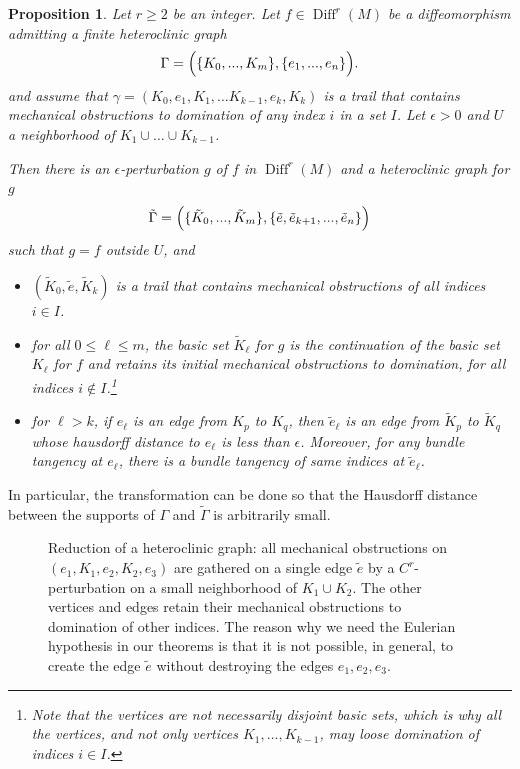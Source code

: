\documentclass[11pt, a4paper]{amsart}
\theoremstyle{plain}
\newtheorem{proposition}{Proposition}[section]        %
\theoremstyle{definition}
\theoremstyle{remark}
\numberwithin{equation}{section}         %
\DeclareMathOperator{\Diff}{{Diff}}
\def\Diff{\operatorname{Diff}}
\begin{document}
\begin{proposition}\label{p.gathering}
Let $r\geq 2$ be an integer. Let $f\in \Diff^r(M)$ be a diffeomorphism admitting a finite heteroclinic graph
$$\Gamma=\Bigl(\{K_0,...,K_m\},\{e_1,...,e_n\}\Bigr).$$
and assume that $\gamma=(K_0,e_1,K_1,\ldots K_{k-1},e_k,K_k)$ is a trail that contains mechanical obstructions to domination of any index $i$ in a set $I$. Let $\epsilon>0$ and $U$ a neighborhood of $K_1\cup \ldots \cup K_{k-1}$.

Then there is an $\epsilon$-perturbation $g$ of $f$ in $\Diff^r(M)$ and a heteroclinic graph for $g$
$$\tilde{\Gamma}=\Bigl(\{\tilde{K}_0,...,\tilde{K}_m\},\{\tilde{e},\tilde{e}_{k+1},...,\tilde{e}_n\}\Bigr)$$
such that $g=f$ outside $U$, and
\begin{itemize}
\item $(\tilde{K}_0,\tilde{e},\tilde{K}_k)$ is a trail that contains mechanical obstructions of all indices $i\in I$.
\item for all $0\leq \ell\leq m$, the basic set $\tilde{K}_\ell$ for $g$ is the continuation of the basic set $K_\ell$ for $f$ and retains its initial mechanical obstructions to domination, for all indices $i\notin I$.\footnote{Note that the vertices are not necessarily disjoint basic sets, which is why all the vertices, and not only vertices $K_1, \ldots ,K_{k-1}$, may loose domination of indices $i\in I$.}
\item for $\ell>k$, if $e_\ell$ is an edge from $K_p$ to $K_q$, then $\tilde{e}_\ell$ is an edge from $\tilde{K}_p$ to $\tilde{K}_q$ whose hausdorff distance to $e_\ell$ is less than $\epsilon$. Moreover, for any bundle tangency at $e_\ell$, there is a bundle tangency of same indices at $\tilde{e}_\ell$.
\end{itemize} 
\end{proposition}
In particular, the transformation can be done so that the Hausdorff distance between the supports of $\Gamma$ and  $\tilde{\Gamma}$ is arbitrarily small.




\begin{figure}%
\begin{center}
\def\svgwidth{350pt}           %

\end{center}
\caption{\small Reduction of a heteroclinic graph: all mechanical obstructions on $(e_1,K_1,e_2,K_2,e_3)$ are gathered on a single edge $\tilde{e}$ by a $C^r$-perturbation on a small neighborhood of $K_1\cup K_2$. The other vertices and edges retain their mechanical obstructions to domination of other indices.
\vskip 1mm
The reason why we need the Eulerian hypothesis in our theorems is that it is not possible, in general, to create the edge $\tilde{e}$ without destroying the edges $e_1,e_2,e_3$.}
\label{f.reductiongraphe}
\end{figure} 
\end{document}
